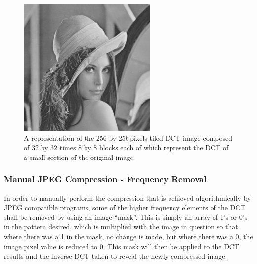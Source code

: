 \begin{figure}[ht]
\begin{minipage}[c]{0.45\linewidth}
	 	\includegraphics[width=\textwidth]{lena.jpg}
	\end{minipage}
	\caption{A representation of the 256 by 256\,pixels tiled DCT image composed of 32 by 32 times 8 by 8 blocks each of which represent the DCT of a small section of the original image.\label{fig:lena_DCT}}
\end{figure}

\subsubsection{Manual JPEG Compression - Frequency Removal} %
\label{sub:manual_jpeg_compression_frequency_removal}
In order to manually perform the compression that is achieved algorithmically by JPEG compatible programs, some of the higher frequency elements of the DCT shall be removed by using an image ``mask''. This is simply an array of 1's or 0's in the pattern desired, which is multiplied with the image in question so that where there was a 1 in the mask, no change is made, but where there was a 0, the image pixel value is reduced to 0. This mask will then be applied to the DCT results and the inverse DCT taken to reveal the newly compressed image. 

